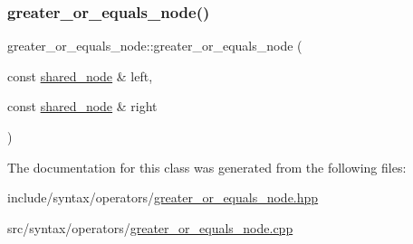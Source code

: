 \subsubsection{\texorpdfstring{greater\+\_\+or\+\_\+equals\+\_\+node()}{greater\_or\_equals\_node()}}
{\footnotesize\ttfamily greater\+\_\+or\+\_\+equals\+\_\+node\+::greater\+\_\+or\+\_\+equals\+\_\+node (\begin{DoxyParamCaption}\item[{const \hyperlink{namespacejawe_a3f307481d921b6cbb50cc8511fc2b544}{shared\+\_\+node} \&}]{left,  }\item[{const \hyperlink{namespacejawe_a3f307481d921b6cbb50cc8511fc2b544}{shared\+\_\+node} \&}]{right }\end{DoxyParamCaption})}



The documentation for this class was generated from the following files\+:\begin{DoxyCompactItemize}
\item 
include/syntax/operators/\hyperlink{greater__or__equals__node_8hpp}{greater\+\_\+or\+\_\+equals\+\_\+node.\+hpp}\item 
src/syntax/operators/\hyperlink{greater__or__equals__node_8cpp}{greater\+\_\+or\+\_\+equals\+\_\+node.\+cpp}\end{DoxyCompactItemize}
